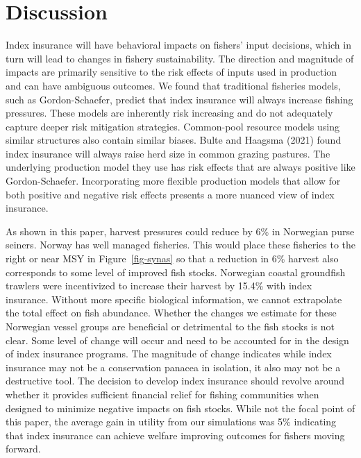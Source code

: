 \documentclass[
  letterpaper,
  DIV=11,
  numbers=noendperiod]{scrartcl}
\theoremstyle{plain}
\theoremstyle{plain}
\theoremstyle{remark}
\begin{document}
\hypertarget{sec-disc}{%
\section{Discussion}\label{sec-disc}}

Index insurance will have behavioral impacts on fishers' input
decisions, which in turn will lead to changes in fishery sustainability.
The direction and magnitude of impacts are primarily sensitive to the
risk effects of inputs used in production and can have ambiguous
outcomes. We found that traditional fisheries models, such as
Gordon-Schaefer, predict that index insurance will always increase
fishing pressures. These models are inherently risk increasing and do
not adequately capture deeper risk mitigation strategies. Common-pool
resource models using similar structures also contain similar biases.
Bulte and Haagsma (2021) found index insurance will always raise herd
size in common grazing pastures. The underlying production model they
use has risk effects that are always positive like Gordon-Schaefer.
Incorporating more flexible production models that allow for both
positive and negative risk effects presents a more nuanced view of index
insurance.

As shown in this paper, harvest pressures could reduce by 6\% in
Norwegian purse seiners. Norway has well managed fisheries. This would
place these fisheries to the right or near MSY in Figure~\ref{fig-synas}
so that a reduction in 6\% harvest also corresponds to some level of
improved fish stocks. Norwegian coastal groundfish trawlers were
incentivized to increase their harvest by 15.4\% with index insurance.
Without more specific biological information, we cannot extrapolate the
total effect on fish abundance. Whether the changes we estimate for
these Norwegian vessel groups are beneficial or detrimental to the fish
stocks is not clear. Some level of change will occur and need to be
accounted for in the design of index insurance programs. The magnitude
of change indicates while index insurance may not be a conservation
panacea in isolation, it also may not be a destructive tool. The
decision to develop index insurance should revolve around whether it
provides sufficient financial relief for fishing communities when
designed to minimize negative impacts on fish stocks. While not the
focal point of this paper, the average gain in utility from our
simulations was 5\% indicating that index insurance can achieve welfare
improving outcomes for fishers moving forward.
\end{document}
